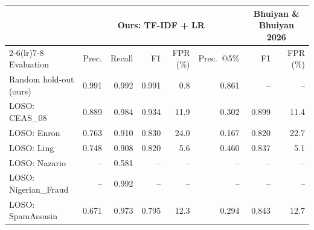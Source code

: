 \begin{tabular}{lrrrrrrr}
\toprule
 & \multicolumn{5}{c}{Ours: TF-IDF + LR} & \multicolumn{2}{c}{Bhuiyan \& Bhuiyan 2026} \\
\cmidrule(lr){2-6}\cmidrule(lr){7-8}
Evaluation & Prec. & Recall & F1 & FPR (\%) & Prec.\ @5\% & F1 & FPR (\%) \\
\midrule
Random hold-out (ours) & 0.991 & 0.992 & 0.991 & 0.8 & 0.861 & -- & -- \\
\midrule
LOSO: CEAS\_08 & 0.889 & 0.984 & 0.934 & 11.9 & 0.302 & 0.899 & 11.4 \\
LOSO: Enron & 0.763 & 0.910 & 0.830 & 24.0 & 0.167 & 0.820 & 22.7 \\
LOSO: Ling & 0.748 & 0.908 & 0.820 & 5.6 & 0.460 & 0.837 & 5.1 \\
LOSO: Nazario & -- & 0.581 & -- & -- & -- & -- & -- \\
LOSO: Nigerian\_Fraud & -- & 0.992 & -- & -- & -- & -- & -- \\
LOSO: SpamAssasin & 0.671 & 0.973 & 0.795 & 12.3 & 0.294 & 0.843 & 12.7 \\
\bottomrule
\end{tabular}
